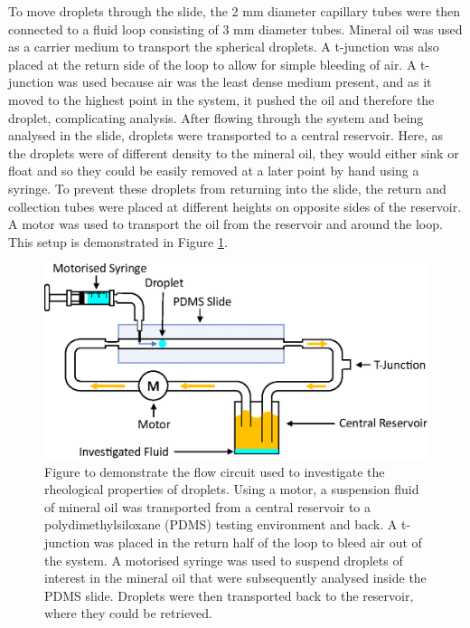 \documentclass{physics_article_B}
\begin{document}
        To move droplets through the slide, the 2 mm diameter capillary tubes were then connected to a fluid loop consisting of 3 mm diameter tubes. Mineral oil was used as a carrier medium to transport the spherical droplets. A t-junction was also placed at the return side of the loop to allow for simple bleeding of air. A t-junction was used because air was the least dense medium present, and as it moved to the highest point in the system, it pushed the oil and therefore the droplet, complicating analysis. After flowing through the system and being analysed in the slide, droplets were transported to a central reservoir. Here, as the droplets were of different density to the mineral oil, they would either sink or float and so they could be easily removed at a later point by hand using a syringe. To prevent these droplets from returning into the slide, the return and collection tubes were placed at different heights on opposite sides of the reservoir. A motor was used to transport the oil from the reservoir and around the loop. This setup is demonstrated in Figure \ref{fig:basic}.
        
            \begin{figure}[H]
                \centering                        
                    \hspace*{2.0cm}\includegraphics[scale=0.8]{Figures/Fluid.eps}
                    \caption{Figure to demonstrate the flow circuit used to investigate the rheological properties of droplets. Using a motor, a suspension fluid of mineral oil was transported from a central reservoir to a polydimethylsiloxane (PDMS) testing environment and back. A t-junction was placed in the return half of the loop to bleed air out of the system. A motorised syringe was used to suspend droplets of interest in the mineral oil that were subsequently analysed inside the PDMS slide. Droplets were then transported back to the reservoir, where they could be retrieved.}     
                \label{fig:basic}
            \end{figure} 
\end{document}
